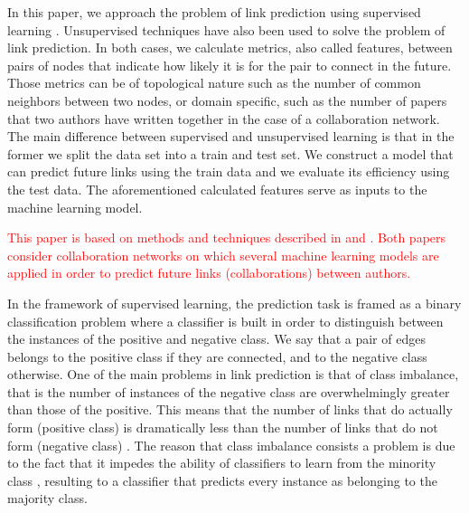 \documentclass{acm_proc_article-sp}
\begin{document}
In this paper, we approach the problem of link prediction using supervised learning \cite{Fire2013, Hasan06linkprediction, Lichtenwalter:2010:NPM:1835804.1835837, Wang:2007:LPM:1441428.1442084}. Unsupervised techniques have also been used to solve the problem of link prediction. In both cases, we calculate metrics, also called features, between pairs of nodes that indicate how likely it is for the pair to connect in the future. Those metrics can be of topological nature such as the number of common neighbors between two nodes, or domain specific, such as the number of papers that two authors have written together in the case of a collaboration network. The main difference between supervised and unsupervised learning is that in the former we split the data set into a train and test set. We construct a model that can predict future links using the train data and we evaluate its efficiency using the test data. The aforementioned calculated features serve as inputs to the machine learning model.




\textcolor{red}{This paper is based on methods and techniques described in \cite{Hasan06linkprediction} and \cite{Lichtenwalter:2010:NPM:1835804.1835837}. Both papers consider collaboration networks on which several machine learning models are applied in order to predict future links (collaborations) between authors.} 

In the framework of supervised learning, the prediction task is framed as a binary classification problem where a classifier is built in order to distinguish between the instances of the positive and negative class. We say that a pair of edges belongs to the positive class if they are connected, and to the negative class otherwise. One of the main problems in link prediction is that of class imbalance, that is the number of instances of the negative class are overwhelmingly greater than those of the positive. This means that the number of links that do actually form (positive class) is dramatically less than the number of links that do not form (negative class) \cite{Lichtenwalter:2010:NPM:1835804.1835837}. The reason that class imbalance consists a problem is due to the fact that it impedes the ability of classifiers to learn from the minority class \cite{Cieslak2012}, resulting to a classifier that predicts every instance as belonging to the majority class. 
 
\end{document}
